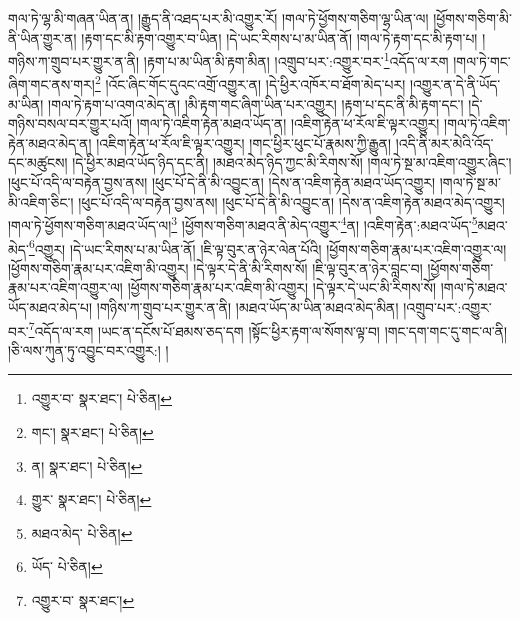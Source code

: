 གལ་ཏེ་ལྷ་མི་གཞན་ཡིན་ན། །རྒྱུད་ནི་འཐད་པར་མི་འགྱུར་རོ། །གལ་ཏེ་ཕྱོགས་གཅིག་ལྷ་ཡིན་ལ། །ཕྱོགས་གཅིག་མི་ནི་ཡིན་གྱུར་ན། །རྟག་དང་མི་རྟག་འགྱུར་བ་ཡིན། །དེ་ཡང་རིགས་པ་མ་ཡིན་ནོ། །གལ་ཏེ་རྟག་དང་མི་རྟག་པ། །གཉིས་ཀ་གྲུབ་པར་གྱུར་ན་ནི། །རྟག་པ་མ་ཡིན་མི་རྟག་མིན། །འགྲུབ་པར་:འགྱུར་བར་\footnote{འགྱུར་བ་  སྣར་ཐང་།  པེ་ཅིན། }འདོད་ལ་རག །གལ་ཏེ་གང་ཞིག་གང་ནས་གར།\footnote{གང་།  སྣར་ཐང་།  པེ་ཅིན། } །འོང་ཞིང་གོང་དུའང་འགྲོ་འགྱུར་ན། །དེ་ཕྱིར་འཁོར་བ་ཐོག་མེད་པར། །འགྱུར་ན་དེ་ནི་ཡོད་མ་ཡིན། །གལ་ཏེ་རྟག་པ་འགའ་མེད་ན། །མི་རྟག་གང་ཞིག་ཡིན་པར་འགྱུར། །རྟག་པ་དང་ནི་མི་རྟག་དང་། །དེ་གཉིས་བསལ་བར་གྱུར་པའོ། །གལ་ཏེ་འཇིག་རྟེན་མཐའ་ཡོད་ན། །འཇིག་རྟེན་ཕ་རོལ་ཇི་ལྟར་འགྱུར། །གལ་ཏེ་འཇིག་རྟེན་མཐའ་མེད་ན། །འཇིག་རྟེན་ཕ་རོལ་ཇི་ལྟར་འགྱུར། །གང་ཕྱིར་ཕུང་པོ་རྣམས་ཀྱི་རྒྱུན། །འདི་ནི་མར་མེའི་འོད་དང་མཚུངས། །དེ་ཕྱིར་མཐའ་ཡོད་ཉིད་དང་ནི། །མཐའ་མེད་ཉིད་ཀྱང་མི་རིགས་སོ། །གལ་ཏེ་སྔ་མ་འཇིག་འགྱུར་ཞིང་། །ཕུང་པོ་འདི་ལ་བརྟེན་བྱས་ནས། །ཕུང་པོ་དེ་ནི་མི་འབྱུང་ན། །དེས་ན་འཇིག་རྟེན་མཐའ་ཡོད་འགྱུར། །གལ་ཏེ་སྔ་མ་མི་འཇིག་ཅིང་། །ཕུང་པོ་འདི་ལ་བརྟེན་བྱས་ནས། །ཕུང་པོ་དེ་ནི་མི་འབྱུང་ན། །དེས་ན་འཇིག་རྟེན་མཐའ་མེད་འགྱུར། །གལ་ཏེ་ཕྱོགས་གཅིག་མཐའ་ཡོད་ལ།\footnote{ན།  སྣར་ཐང་།  པེ་ཅིན། } །ཕྱོགས་གཅིག་མཐའ་ནི་མེད་འགྱུར་\footnote{གྱུར་  སྣར་ཐང་།  པེ་ཅིན། }ན། །འཇིག་རྟེན་:མཐའ་ཡོད་\footnote{མཐའ་མེད་  པེ་ཅིན། }མཐའ་མེད་\footnote{ཡོད་  པེ་ཅིན། }འགྱུར། །དེ་ཡང་རིགས་པ་མ་ཡིན་ནོ། །ཇི་ལྟ་བུར་ན་ཉེར་ལེན་པོའི། །ཕྱོགས་གཅིག་རྣམ་པར་འཇིག་འགྱུར་ལ། །ཕྱོགས་གཅིག་རྣམ་པར་འཇིག་མི་འགྱུར། །དེ་ལྟར་དེ་ནི་མི་རིགས་སོ། །ཇི་ལྟ་བུར་ན་ཉེར་བླང་བ། །ཕྱོགས་གཅིག་རྣམ་པར་འཇིག་འགྱུར་ལ། །ཕྱོགས་གཅིག་རྣམ་པར་འཇིག་མི་འགྱུར། །དེ་ལྟར་དེ་ཡང་མི་རིགས་སོ། །གལ་ཏེ་མཐའ་ཡོད་མཐའ་མེད་པ། །གཉིས་ཀ་གྲུབ་པར་གྱུར་ན་ནི། །མཐའ་ཡོད་མ་ཡིན་མཐའ་མེད་མིན། །འགྲུབ་པར་:འགྱུར་བར་\footnote{འགྱུར་བ་  སྣར་ཐང་། }འདོད་ལ་རག །ཡང་ན་དངོས་པོ་ཐམས་ཅད་དག །སྟོང་ཕྱིར་རྟག་ལ་སོགས་ལྟ་བ། །གང་དག་གང་དུ་གང་ལ་ནི། །ཅི་ལས་ཀུན་ཏུ་འབྱུང་བར་འགྱུར:། །
